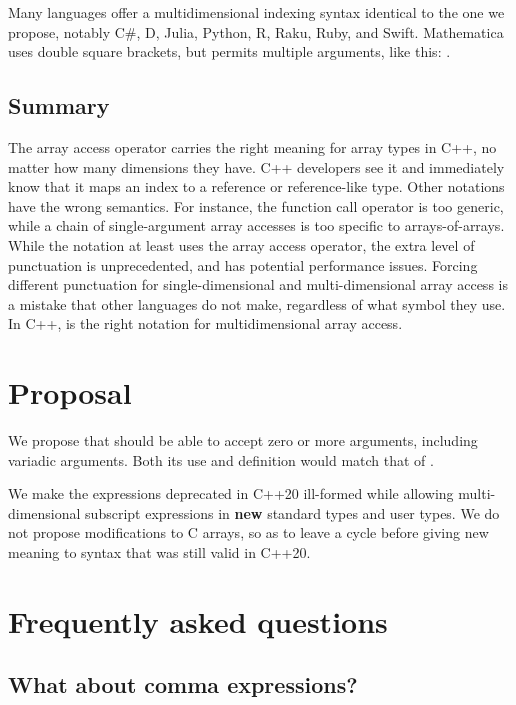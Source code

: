 \documentclass{wg21}
\begin{document}
Many languages offer a multidimensional indexing syntax identical to the one we propose, notably C\#, D, Julia, Python, R, Raku, Ruby, and Swift.  Mathematica uses double square brackets, but permits multiple arguments, like this: .

\subsection{Summary}

The array access operator carries the right meaning for array types in C++, no matter how many dimensions they have.  C++ developers see it and immediately know that it maps an index to a reference or reference-like type.  Other notations have the wrong semantics.  For instance, the function call operator is too generic, while a chain of single-argument array accesses is too specific to arrays-of-arrays.  While the notation  at least uses the array access operator, the extra level of punctuation is unprecedented, and has potential performance issues.  Forcing different punctuation for single-dimensional and multi-dimensional array access is a mistake that other languages do not make, regardless of what symbol they use.  In C++,  is the right notation for multidimensional array access.

\section{Proposal}

We propose that  should be able to accept zero or more arguments, including variadic arguments.
Both its use and definition would match that of .

We make the expressions deprecated in C++20 ill-formed while allowing multi-dimensional subscript expressions in \textbf{new} standard types
and user types. We do not propose modifications to C arrays, so as to leave a cycle before giving new meaning to syntax that was still valid in C++20.

\section{Frequently asked questions}

\subsection{What about comma expressions?}
\end{document}
